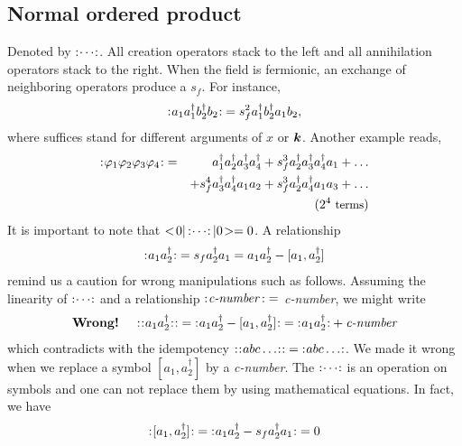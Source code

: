 \subsection{Normal ordered product}
Denoted by ${:\mathrel{\mspace{1mu}\cdots\mspace{1mu}}:}$.
All creation operators stack to the left and all annihilation operators stack to the right.
When the field is fermionic, an exchange of neighboring operators produce a $s_f$.
For instance, 
\begin{eqnarray}
{:\mathrel{\mspace{1mu}a_1 a^\dagger_1 b^\dagger_2 b_2\mspace{1mu}}:} = s_f^{2} a^\dagger_1 b^\dagger_2 a_1 b_2,
\end{eqnarray}
where suffices stand for different arguments of $x$ or $\mbox{\boldmath $k$}$.
Another example reads,
\begin{eqnarray}
{:\mathrel{\mspace{1mu}\varphi_1 \varphi_2 \varphi_3 \varphi_4\mspace{1mu}}:}
&=&
a_1^\dagger a_2^\dagger a_3^\dagger a_4^\dagger 
+ s_f^3 a_2^\dagger a_3^\dagger a_4^\dagger  a_1 + \dots
\nonumber\\
&&
+ s_f^4 a_3^\dagger a_4^\dagger  a_1  a_2 
+ s_f^3 a_2^\dagger a_4^\dagger  a_1  a_3 + 
\dots
\nonumber\\
&& {\small ( 2^4\mbox{ terms})}
\label{eqn:normalprod4fields}
\end{eqnarray}
It is important to note that $<\! 0 |\, {:\mathrel{\mspace{1mu}\cdots\mspace{1mu}}:} \,| 0 \!> = 0$.
A relationship
\begin{eqnarray}
{:\mathrel{\mspace{1mu}a_1 a_2^\dagger\mspace{1mu}}:}
= s_f a_2^\dagger a_1 
= a_1 a_2^\dagger - [a_1, a_2^\dagger]
\end{eqnarray}
remind us a caution 
for wrong manipulations such as follows.
Assuming the linearity of ${:\mathrel{\mspace{1mu}\cdots\mspace{1mu}}:}$ and a relationship 
${:\mathrel{\mspace{1mu}\mbox{\it c-number}\,\mspace{1mu}}:} = $ {\it c-number},
we might write
\begin{eqnarray}
\mbox{\bf Wrong!}
\hspace{5mm}
{:\mathrel{\mspace{1mu} {:\mathrel{\mspace{1mu}a_1 a_2^\dagger\mspace{1mu}}:} \mspace{1mu}}:} = {:\mathrel{\mspace{1mu}a_1 a_2^\dagger - [a_1, a_2^\dagger]\mspace{1mu}}:}
= {:\mathrel{\mspace{1mu}a_1 a_2^\dagger\mspace{1mu}}:} + \mbox{\it c-number}
\end{eqnarray}
which contradicts with the idempotency ${:\mathrel{\mspace{1mu}{:\mathrel{\mspace{1mu}abc\dots\mspace{1mu}}:}\mspace{1mu}}:} = {:\mathrel{\mspace{1mu}abc\dots\mspace{1mu}}:}$.
We made it wrong when we replace a symbol $[a_1, a_2^\dagger]$ by a {\it c-number}.
The ${:\mathrel{\mspace{1mu}\cdots\mspace{1mu}}:}$ is an operation on symbols and one can not replace them
by using mathematical equations. In fact, we have
\begin{eqnarray}
{:\mathrel{\mspace{1mu}[a_1, a_2^\dagger]\mspace{1mu}}:} = {:\mathrel{\mspace{1mu} a_1 a_2^\dagger - s_f a_2^\dagger a_1 \mspace{1mu}}:} = 0
\end{eqnarray}
